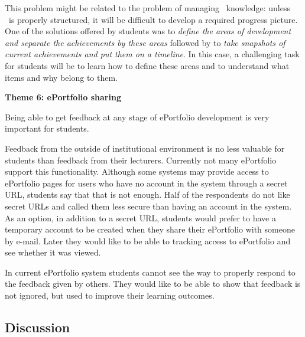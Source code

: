 This problem might be related to the problem of managing \ep~knowledge: unless
\ep~is properly structured, it will be difficult to develop a required progress
picture. One of the solutions offered by students was to \textit{define the
areas of development and separate the achievements by these areas} followed by
to \textit{take snapshots of current achievements and put them on a timeline}.
In this case, a challenging task for students will be to learn how to define these areas and to
understand what items and why belong to them.

\textbf{Theme 6: ePortfolio sharing}

Being able to get feedback at any stage of ePortfolio development is very
important for students. 


Feedback from the outside of institutional environment is no less valuable for students than feedback
from their lecturers. Currently not many ePortfolio support this functionality. Although some systems may
provide access to ePortfolio pages for users who have no account in the system through a secret URL, students
say that that is not enough. Half of the respondents do not like secret URLs and called them less secure than
having an account in the system. As an option, in addition to a secret URL, students would prefer to have a
temporary account to be created when they share their ePortfolio with someone by e-mail. Later they would like
to be able to tracking access to ePortfolio and see whether it was viewed.

In current ePortfolio system students cannot see the way to properly respond to the feedback given by
others. They would like to be able to show that feedback is not ignored, but used to improve their learning
outcomes.


\subsection{Discussion}

